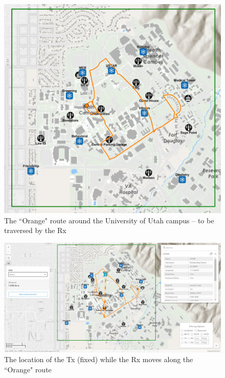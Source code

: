 \documentclass[12pt]{article}
\newcommand{\areaofinterestfigwidth}{1.0\textwidth}
\begin{document}
\begin{itemize}
            \begin{figure}
                \centering
                \includegraphics[width=\areaofinterestfigwidth]{figs/Orange_Route_3.png}
                \caption{The ``Orange" route around the University of Utah campus -- to be traversed by the Rx}
                \label{fig:Rx_2}
            \end{figure}
            \begin{figure}
                \centering
                \includegraphics[width=\areaofinterestfigwidth]{figs/Orange_Route_3_with_USTAR_Tx.png}
                \caption{The location of the Tx (fixed) while the Rx moves along the ``Orange" route}
                \label{fig:Tx_2}
            \end{figure}

\end{itemize}
\end{document}

